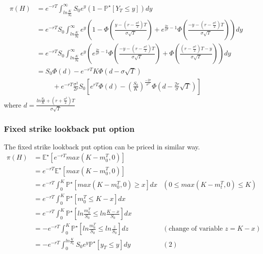 \documentclass{article}
\begin{document}
\begin{align*}
\pi(H) 	&= e^{-rT} \int_{ln\frac{K}{S_0}}^{\infty} S_0e^y( 1 - \mathbb{P}^{\star}[Y_T \leq y])dy \\
			&= e^{-rT}S_0 \int_{ln\frac{K}{S_0}}^{\infty} e^y \left( 1 -  
			\Phi \left(\frac{y-(r-\frac{\sigma^2}{2})T}{\sigma\sqrt{T}} \right) + e^{\frac{2r}{\sigma^2} - 1} \Phi \left(\frac{-y-(r-\frac{\sigma^2}{2})T}{\sigma\sqrt{T}} \right)
			\right) dy \\
			&= e^{-rT}S_0 \int_{ln\frac{K}{S_0}}^{\infty} e^y \left( 
			e^{\frac{2r}{\sigma^2} - 1} \Phi \left(\frac{-y-(r-\frac{\sigma^2}{2})T}{\sigma\sqrt{T}} \right)
			+ \Phi \left(\frac{(r-\frac{\sigma^2}{2})T - y}{\sigma\sqrt{T}} \right)
			\right) dy \\
			&= S_0 \Phi(d) - e^{-rT}K \Phi(d - \sigma \sqrt{T} ) \\
			&\hspace{1cm} + e^{-rT}\frac{\sigma^2}{2r}S_0 \left[
			e^{rT}\Phi(d) - \left(\frac{S_0}{K}\right)^{\frac{-2r}{\sigma^2}} \Phi\left(d- \frac{2r}{\sigma}\sqrt{T}\right)
			\right]
\end{align*}
where $d = \frac{ln\frac{S_0}{K} + (r+\frac{\sigma^2}{2})T}{\sigma\sqrt{T}}$

\subsubsection{Fixed strike lookback put option
}
The fixed strike lookback put option can be priced in similar way.
\begin{align*}
\pi(H) 	&= \mathbb{E^{\star}}[e^{-rT} max(K - m_{0}^T, 0)] \\
			&= e^{-rT} \mathbb{E^{\star}}[max(K - m_{0}^T, 0)] \\
			&= e^{-rT} \int_{0}^{K} \mathbb{P}^{\star}[max(K - m_{0}^T, 0) \geq x]dx  &(0 \leq max(K - m_{t}^{T}, 0) \leq K)\\
			&= e^{-rT} \int_{0}^{K} \mathbb{P}^{\star}[m_{0}^T \leq K-x]dx \\
			&= e^{-rT} \int_{0}^{K} \mathbb{P}^{\star}[ln \frac{m_{0}^T}{S_0} \leq ln \frac{K-x}{S_0}]dx \\
			&= -e^{-rT} \int_{0}^{K} \mathbb{P}^{\star}[ln \frac{m_{0}^T}{S_0} \leq ln \frac{z}{S_0}]dz &(\text{change of variable } z=K-x) \\
			&= -e^{-rT} \int_{0}^{ln\frac{K}{S_0}} S_0e^{y} \mathbb{P}^{\star}[y_T \leq y]dy &(2)
\end{align*}
\end{document}
